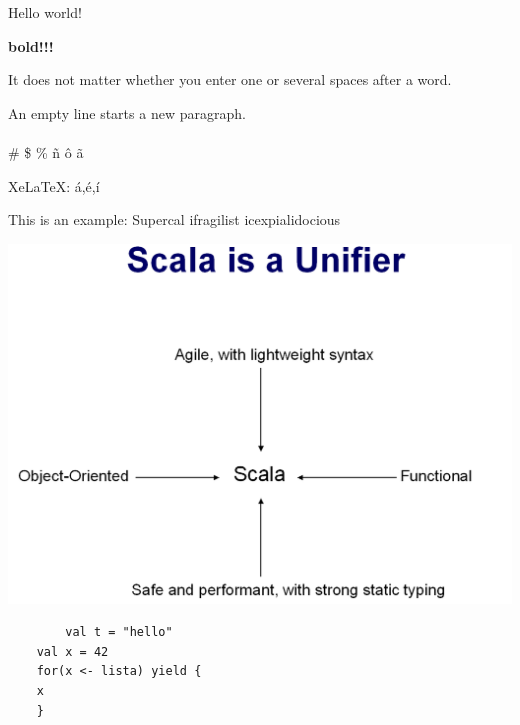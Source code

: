 \documentclass{article}
\begin{document}
Hello world!

\textbf{bold!!!}

It does not matter whether you
enter one or several             spaces
after a word.

An empty line starts a new
paragraph.
\\ \\
\# \$ \% \~n \^o \~a

XeLaTeX: á,é,í

This is an %
example: Supercal%
            ifragilist%
icexpialidocious

\includegraphics[scale=0.20]{Scala-is-a-Unifier.png}

    \begin{lstlisting}
    	val t = "hello" 
    val x = 42 
    for(x <- lista) yield {
 	x
    }

    \end{lstlisting}
\end{document}
